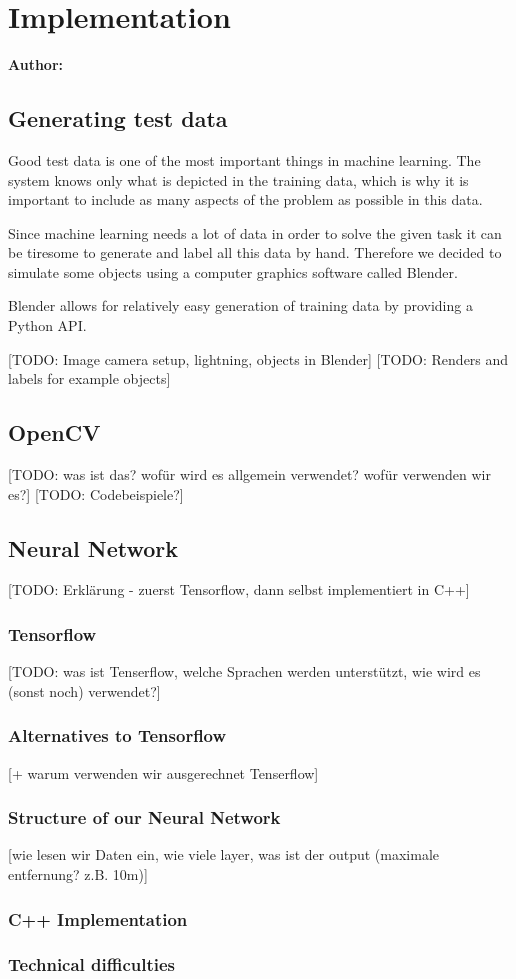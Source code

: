\chapter{Implementation}

\textbf{Author: } 

\section{Generating test data}
Good test data is one of the most important things in machine learning. The system knows only what is depicted in the training data, which is why it is important to include as many aspects of the problem as possible in this data.

Since machine learning needs a lot of data in order to solve the given task it can be tiresome to generate and label all this data by hand. Therefore we decided to simulate some objects using a computer graphics software called Blender.

Blender allows for relatively easy generation of training data by providing a Python API.

[TODO: Image camera setup, lightning, objects in Blender]
[TODO: Renders and labels for example objects]

\section{OpenCV}

[TODO: was ist das? wofür wird es allgemein verwendet? wofür verwenden wir es?]
[TODO: Codebeispiele?]

\section{Neural Network}

[TODO: Erklärung - zuerst Tensorflow, dann selbst implementiert in C++]

\subsection{Tensorflow}

[TODO: was ist Tenserflow, welche Sprachen werden unterstützt, wie wird es (sonst noch) verwendet?]

\subsection{Alternatives to Tensorflow}

[+ warum verwenden wir ausgerechnet Tenserflow]

\subsection{Structure of our Neural Network}

[wie lesen wir Daten ein, wie viele layer, was ist der output (maximale entfernung? z.B. 10m)]

\subsection{C++ Implementation}

\subsection{Technical difficulties}

\filbreak